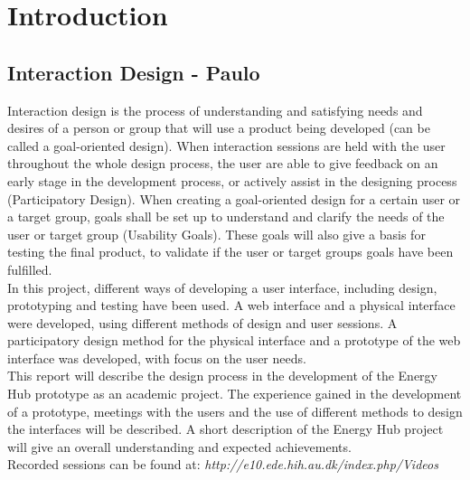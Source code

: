 \chapter{Introduction}
\section{Interaction Design - Paulo}
Interaction design is the process of understanding and satisfying needs and desires of a person or group that will use a product being developed (can be called a goal-oriented design). When interaction sessions are held with the user throughout the whole design process, the user are able to give feedback on an early stage in the development process, or actively assist in the designing process (Participatory Design).
When creating a goal-oriented design for a certain user or a target group, goals shall be set up to understand and clarify the needs of the user or target group (Usability Goals). These goals will also give a basis for testing the final product, to validate if the user or target groups goals have been fulfilled.
\\[0.2cm]
In this project, different ways of developing a user interface, including design, prototyping and testing have been used.
A web interface and a physical interface were developed, using different methods of design and user sessions. A participatory design method for the physical interface and a prototype of the web interface was developed, with focus on the user needs.
\\[0.2cm]
This report will describe the design process in the development of the Energy Hub prototype as an academic project. The experience gained in the development of a prototype, meetings with the users and the use of different methods to design the interfaces will be described. A short description of the Energy Hub project will give an overall understanding and expected achievements.
\\[0.5cm]
Recorded sessions can be found at: \textit{http://e10.ede.hih.au.dk/index.php/Videos}
